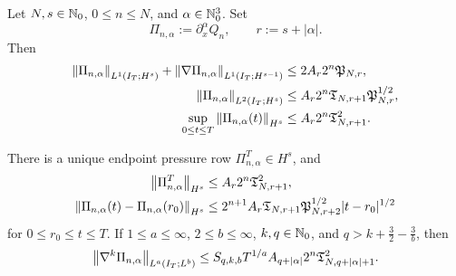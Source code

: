 \begin{theorem}
\label{u:thm:qc-pressure-rows}
\begin{samepage}
Let \(N,s\in\mathbb N_0\), \(0\le n\le N\), and
\(\alpha\in\mathbb N_0^3\).  Set
\[
 \Pi_{n,\alpha}:=\partial_x^\alpha Q_n,
 \qquad r:=s+|\alpha|.
\]
Then
\begin{align}
 \left\lVert \Pi_{n,\alpha}\right\rVert_{L^1(I_T;H^s)}
 +\left\lVert \nabla\Pi_{n,\alpha}\right\rVert_{L^1(I_T;H^{s-1})}
 &\le 2A_r2^n\mathfrak P_{N,r},
 \label{u:eq:qc-pressure-l1}\\
 \left\lVert \Pi_{n,\alpha}\right\rVert_{L^2(I_T;H^s)}
 &\le A_r2^n
 \mathfrak T_{N,r+1}\mathfrak P_{N,r}^{1/2},
 \label{u:eq:qc-pressure-l2}\\
 \sup_{0\le t\le T}\left\lVert \Pi_{n,\alpha}(t)\right\rVert_{H^s}
 &\le A_r2^n\mathfrak T_{N,r+1}^2.
 \label{u:eq:qc-pressure-sup}
\end{align}
\end{samepage}
There is a unique endpoint pressure row \(\Pi_{n,\alpha}^T\in H^s\), and
\begin{align}
 \left\lVert \Pi_{n,\alpha}^T\right\rVert_{H^s}
 &\le A_r2^n\mathfrak T_{N,r+1}^2,
 \label{u:eq:qc-pressure-endpoint}\\
 \left\lVert \Pi_{n,\alpha}(t)-\Pi_{n,\alpha}(r_0)\right\rVert_{H^s}
 &\le 2^{n+1}A_r\mathfrak T_{N,r+1}
 \mathfrak P_{N,r+2}^{1/2}|t-r_0|^{1/2}
 \label{u:eq:qc-pressure-modulus}
\end{align}
for \(0\le r_0\le t\le T\).  If
\(1\le a\le\infty\), \(2\le b\le\infty\),
\(k,q\in\mathbb N_0\), and
\(q>k+\frac32-\frac3b\), then
\begin{equation}
 \left\lVert \nabla^k\Pi_{n,\alpha}\right\rVert_{L^a(I_T;L^b)}
 \le
 S_{q,k,b}T^{1/a}A_{q+|\alpha|}2^n
 \mathfrak T_{N,q+|\alpha|+1}^2.
 \label{u:eq:qc-pressure-la-lb}
\end{equation}
\end{theorem}


